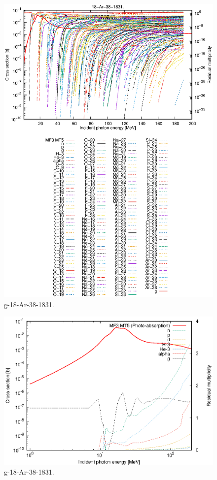 \begin{figure}
 \includegraphics[width=\linewidth]{eps/g_18-Ar-38_1831.eps}
  \caption{g-18-Ar-38-1831.}
\end{figure}
\newpage \clearpage

\begin{figure}
 \includegraphics[width=\linewidth]{eps-log/g_18-Ar-38_1831.eps}
 \caption{g-18-Ar-38-1831.}
\end{figure}
\newpage \clearpage

